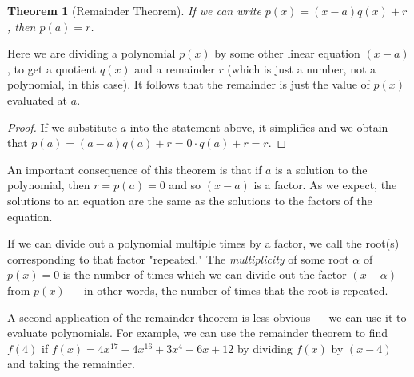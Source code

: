 \documentclass[a4paper,10pt,titlepage]{article}
\newtheorem*{thm}{Theorem}
\theoremstyle{definition}
\begin{document}
\begin{thm}[Remainder Theorem]
  If we can write $ p(x) = (x-a) q(x) + r $, then $ p(a) = r $.
\end{thm}

Here we are dividing a polynomial $ p(x) $ by some other
linear equation $ (x-a) $, to get a quotient $ q(x) $ and a remainder $ r $
(which is just a number, not a polynomial, in this case). It follows that the
remainder is just the value of $ p(x) $ evaluated at $ a $.

\begin{proof}
  If we substitute $ a $ into the statement above, it simplifies and we obtain that
  $ p(a) = (a - a)q(a) + r = 0\cdot q(a) + r = r $.
\end{proof}

An important consequence of this theorem is that if $ a $ is a solution to the
polynomial, then $ r = p(a) = 0 $ and so $ (x - a) $ is a factor. As we expect,
the solutions to an equation are the same as the solutions to the factors of the equation.

If we can divide out a polynomial multiple times by a factor, we call the
root(s) corresponding to that factor "repeated." The \textit{multiplicity}
of some root $ \alpha $ of $ p(x) = 0 $ is the number of times which we can divide out the factor
$ (x - \alpha) $ from $ p(x) $ --- in other words, the number of times that
the root is repeated.

A second application of the remainder theorem is less obvious --- we can
use it to evaluate polynomials. For example, we can use the remainder theorem
to find $ f(4) $ if $ f(x) = 4x^{17} - 4x^{16} + 3x^4 - 6x + 12 $ by dividing $ f(x) $
by $ (x - 4) $ and taking the remainder.
\end{document}
